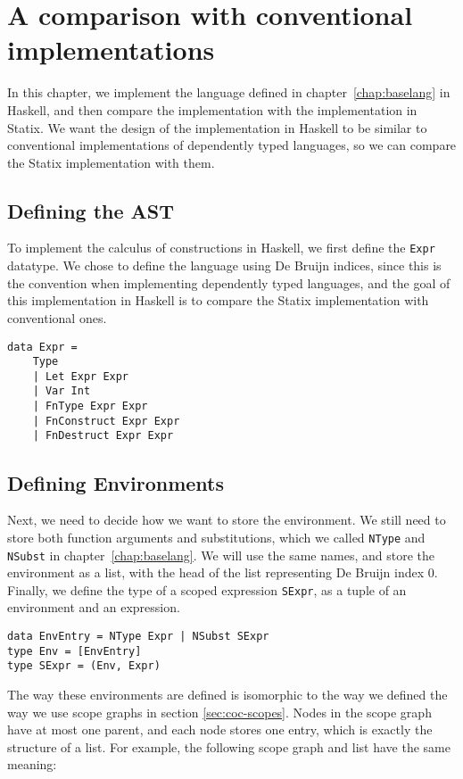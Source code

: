 \chapter{A comparison with conventional implementations}
\label{ch:comp-haskell}

In this chapter, we implement the language defined in chapter~\ref{chap:baselang} in Haskell, and then compare the implementation with the implementation in Statix. We want the design of the implementation in Haskell to be similar to conventional implementations of dependently typed languages, so we can compare the Statix implementation with them.

\section{Defining the AST}
To implement the calculus of constructions in Haskell, we first define the \verb|Expr| datatype. We chose to define the language using De Bruijn indices, since this is the convention when implementing dependently typed languages, and the goal of this implementation in Haskell is to compare the Statix implementation with conventional ones. 
\begin{lstlisting}
data Expr =
	Type
	| Let Expr Expr
	| Var Int
	| FnType Expr Expr
	| FnConstruct Expr Expr
	| FnDestruct Expr Expr
\end{lstlisting}

\section{Defining Environments}

Next, we need to decide how we want to store the environment. We still need to store both function arguments and substitutions, which we called \verb|NType| and \verb|NSubst| in chapter~\ref{chap:baselang}. We will use the same names, and store the environment as a list, with the head of the list representing De Bruijn index 0. Finally, we define the type of a scoped expression \verb|SExpr|, as a tuple of an environment and an expression.
\begin{lstlisting}
data EnvEntry = NType Expr | NSubst SExpr
type Env = [EnvEntry]
type SExpr = (Env, Expr)
\end{lstlisting}

The way these environments are defined is isomorphic to the way we defined the way we use scope graphs in section \ref{sec:coc-scopes}. Nodes in the scope graph have at most one parent, and each node stores one entry, which is exactly the structure of a list. For example, the following scope graph and list have the same meaning:

